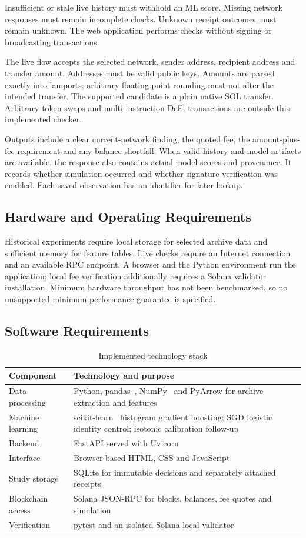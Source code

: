 \documentclass[12pt,a4paper,oneside]{report}
\begin{document}
Insufficient or stale live history must withhold an ML score. Missing network responses must remain incomplete checks. Unknown receipt outcomes must remain unknown. The web application performs checks without signing or broadcasting transactions.


The live flow accepts the selected network, sender address, recipient address and transfer amount. Addresses must be valid public keys. Amounts are parsed exactly into lamports; arbitrary floating-point rounding must not alter the intended transfer. The supported candidate is a plain native SOL transfer. Arbitrary token swaps and multi-instruction DeFi transactions are outside this implemented checker.

Outputs include a clear current-network finding, the quoted fee, the amount-plus-fee requirement and any balance shortfall. When valid history and model artifacts are available, the response also contains actual model scores and provenance. It records whether simulation occurred and whether signature verification was enabled. Each saved observation has an identifier for later lookup.

\subsection{Hardware and Operating Requirements}
Historical experiments require local storage for selected archive data and sufficient memory for feature tables. Live checks require an Internet connection and an available RPC endpoint. A browser and the Python environment run the application; local fee verification additionally requires a Solana validator installation. Minimum hardware throughput has not been benchmarked, so no unsupported minimum performance guarantee is specified.

\subsection{Software Requirements}
\begin{table}[H]\centering\caption{Implemented technology stack}
\begin{tabularx}{\textwidth}{p{38mm}Y}\toprule Component&Technology and purpose\\\midrule
Data processing&Python, pandas~\cite{pandas}, NumPy~\cite{numpy} and PyArrow for archive extraction and features\\
Machine learning&scikit-learn~\cite{sklearn} histogram gradient boosting; SGD logistic identity control; isotonic calibration follow-up\\
Backend&FastAPI served with Uvicorn\\
Interface&Browser-based HTML, CSS and JavaScript\\
Study storage&SQLite for immutable decisions and separately attached receipts\\
Blockchain access&Solana JSON-RPC for blocks, balances, fee quotes and simulation\\
Verification&pytest and an isolated Solana local validator\\\bottomrule\end{tabularx}\end{table}
\end{document}
